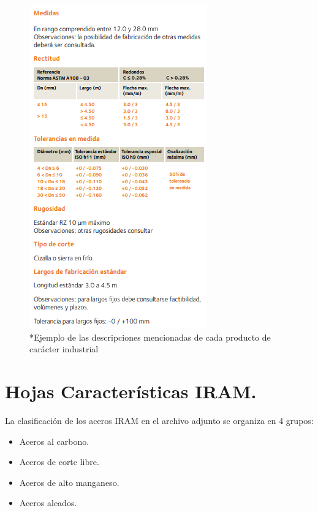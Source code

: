 \documentclass[12pt,a4paper]{article}
\begin{document}
\begin{figure}[H]
\begin{minipage}{0.45\textwidth}
        \includegraphics[width=\textwidth]{Inagenes para latex/19.png}
    \end{minipage}
    \caption*{*Ejemplo de las descripciones mencionadas de cada producto de carácter industrial}
\end{figure}

\section{Hojas Características IRAM.}
La clasificación de los aceros IRAM en el archivo adjunto se organiza en 4 grupos:
\begin{itemize}
    \item Aceros al carbono.
    \item Aceros de corte libre.
    \item Aceros de alto manganeso.
    \item Aceros aleados.
\end{itemize}
\end{document}
